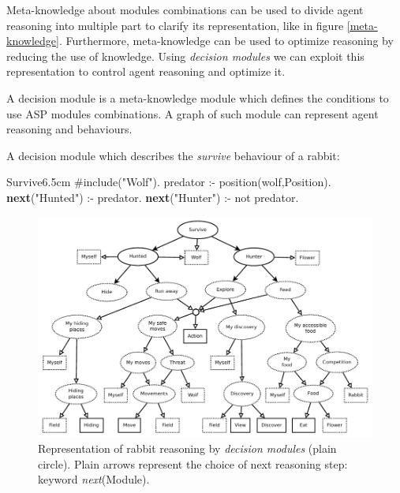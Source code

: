 \documentclass{aamas2012}
\begin{document}
	Meta-knowledge about modules combinations can be used to divide agent reasoning into multiple part to clarify its representation,
	like in figure \ref{meta-knowledge}.
	Furthermore, meta-knowledge can be used to optimize reasoning by reducing the use of knowledge.
	Using \emph{decision modules} we can exploit this representation to control agent reasoning and optimize it.
	
	\begin{definition}
		A decision module is a meta-knowledge module which defines the conditions to use ASP modules combinations.
		A graph of such module can represent agent reasoning and behaviours.
	\end{definition}
	
	\begin{example}
		\label{survive_example}
		A decision module which describes the \emph{survive} behaviour of a rabbit:\newline
		\begin{module}{Survive}{6.5cm}
			\#include("Wolf").\newline
			\newline
			predator :- position(wolf,Position).\newline
			\textbf{next}("Hunted") :- predator.\newline
			\textbf{next}("Hunter") :- not predator.
		\end{module}
	\end{example}
	
	\begin{figure}
		\centering
		\includegraphics[keepaspectratio=true, scale=1]{reasoning.pdf}
		\caption
		{
			\label{reasoning}
			Representation of rabbit reasoning by \emph{decision modules} (plain circle).
			Plain arrows represent the choice of next reasoning step: keyword \emph{next}(Module).
		}
	\end{figure}
	
\end{document}
